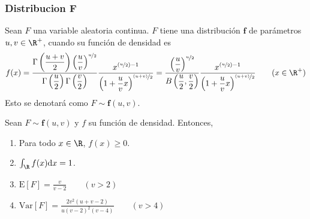 \subsubsection{Distribucion F}

\begin{Def}
  Sean $F$ una variable aleatoria continua. $F$ tiene una distribución
  $\mathbf{f}$ de parámetros $u,v\in\R^+$, cuando su función de densidad es
  \[f(x)=
  \dfrac{\Gamma\left(\frac{u+v}{2}\right)\left(\frac{u}{v}\right)^{\nicefrac{u}{2}}}
  {\Gamma\left(\frac{u}{2}\right)\Gamma\left(\frac{v}{2}\right)}
  \dfrac{x^{(\nicefrac{u}{2})-1}}
  {\left(1 + \frac{u}{v}x\right)^{\nicefrac{(u+v)}{2}}}
  =
  \dfrac{\left(\frac{u}{v}\right)^{\nicefrac{u}{2}}}
    {B\left(\frac{u}{2},\frac{v}{2}\right)}
  \dfrac{x^{(\nicefrac{u}{2})-1}}
    {\left(1 + \frac{u}{v}x\right)^{\nicefrac{(u+v)}{2}}}
  \qquad (x\in\R^+)
  \]
  Esto se denotará como $F\sim\mathbf{f}(u,v)$.
\end{Def}
\begin{Teo}
  Sean $F\sim \mathbf{f}(u,v)$ y $f$ su función de densidad. Entonces,
  \begin{enumerate}
    \item Para todo $x\in\R$, $f(x) \geq 0$.
    \item $\int_{\R}f(x)\mathrm{d}x=1$.
    \item $\text{E}[F]=\frac{v}{v-2} \qquad(v>2)$
    \item $\text{Var}[F]=\frac{2v^2(u+v-2)}{u(v-2)^2(v-4)}\qquad(v>4)$
  \end{enumerate}
\end{Teo}
